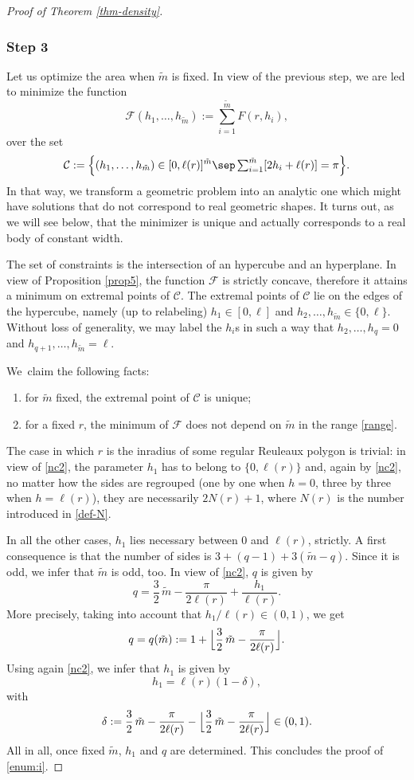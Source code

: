 \begin{proof}[Proof of Theorem \ref{thm-density}]
\subsubsection*{Step 3} Let us optimize the area when $\tilde{m}$ is fixed. In view of the previous step, we are led to minimize the function
\[
\mathcal F(h_1,\ldots, h_{\tilde{m}}):=\sum_{i=1}^{\tilde{m}} F(r,h_i),
\]
over the set
\[
\mathcal C:=\Bigl\{ (h_1,\ldots, h_{\tilde{m}})\in [0,\ell(r)]^{\tilde{m}}\sep\textstyle \sum_{i=1}^{\tilde{m}} [2h_i + \ell(r)] = \pi\Bigr\}.
\]
In that way, we transform a geometric problem into an analytic one which might have
solutions that do not correspond to real geometric shapes. It turns out, as we will see
below, that the minimizer is unique and actually corresponds to a real body of constant width.

The set of constraints is the intersection of an hypercube and an hyperplane. In view of Proposition \ref{prop5}, the function $\mathcal F$ is strictly concave, therefore it attains a minimum on extremal points of $\mathcal C$. The extremal points of $\mathcal C$ lie on the edges of the hypercube, namely (up to relabeling) $h_1\in [0,\ell]$ and $h_2,\ldots, h_{\tilde{m}}\in \{0,\ell\}$. \hbox{Without} loss of generality, we may label the $h_i$s in such a way that $h_2,\ldots, h_q=0$ and $h_{q+1}, \ldots, h_{\tilde{m}}=\ell$.

We~claim the following facts:
\begin{enumerate}
\item\label{enum:i}
for $\tilde{m}$ fixed, the extremal point of $\mathcal C$ is unique;
\item\label{enum:ii}
for a fixed $r$, the minimum of $\mathcal F$ does not depend on $\tilde{m}$ in the range \eqref{range}.
\end{enumerate}
The case in which $r$ is the inradius of some regular Reuleaux polygon is trivial: in view of \eqref{nc2}, the parameter $h_1$ has to belong to $\{0,\ell(r)\}$ and, again by \eqref{nc2}, no matter how the sides are regrouped (one by one when $h=0$, three by three when $h=\ell(r)$), they are necessarily $2N(r)+1$, where $N(r)$ is the number introduced in \eqref{def-N}.

In all the other cases, $h_1$ lies necessary between $0$ and $\ell(r)$, strictly. A first consequence is that the number of sides is $3 + (q-1)+3(\tilde{m}-q)$. Since it is odd, we infer that $\tilde{m}$ is odd, too. In view of \eqref{nc2}, $q$ is given by
\[
q = \frac32\, \tilde{m} - \frac{\pi}{2\ell(r)}+ \frac{h_1}{\ell(r)}.
\]
More precisely, taking into account that $h_1/\ell(r) \in (0,1)$, we get
\[
q=q(\tilde{m}):=1+\Bigl\lfloor \frac32\, \tilde{m} - \frac{\pi}{2\ell(r)} \Bigr\rfloor.
\]
Using again \eqref{nc2}, we infer that $h_1$ is given by
\[
h_1=\ell(r)(1-\delta),
\]
with
\[
\delta:= \frac32\, \tilde{m} - \frac{\pi}{2\ell(r)} - \Bigl\lfloor \frac32\, \tilde{m} - \frac{\pi}{2\ell(r)}\Bigr\rfloor \in (0,1).
\]
All in all, once fixed $\tilde{m}$, $h_1$ and $q$ are determined. This concludes the proof of \eqref{enum:i}.


\end{proof}
